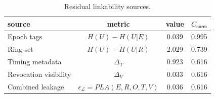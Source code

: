 \begin{table}[htbp]
\centering
\caption{Residual linkability sources.}
\label{tab:residual-sources}
\begin{tabular}{@{}lccc@{}}
\toprule
source & metric & value & $C_{\mathsf{norm}}$ \\
\midrule
Epoch tags & $H(U)-H(U|E)$ & 0.039 & 0.995 \\
Ring set & $H(U)-H(U|R)$ & 2.029 & 0.739 \\
Timing metadata & $\Delta_T$ & 0.923 & 0.616 \\
Revocation visibility & $\Delta_V$ & 0.033 & 0.616 \\
Combined leakage & $\epsilon_{\mathcal{L}}=PLA(E,R,O,T,V)$ & 0.036 & 0.616 \\
\bottomrule
\end{tabular}
\end{table}
